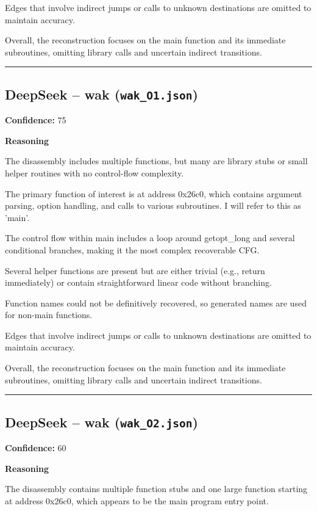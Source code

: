Edges that involve indirect jumps or calls to unknown destinations are omitted to maintain accuracy.

Overall, the reconstruction focuses on the main function and its immediate subroutines, omitting library calls and uncertain indirect transitions.

\bigskip
\hrule
\bigskip

\subsection{DeepSeek -- wak (\texttt{wak\_O1.json})}

\textbf{Confidence:} 75

\textbf{Reasoning}

The disassembly includes multiple functions, but many are library stubs or small helper routines with no control-flow complexity.

The primary function of interest is at address 0x26c0, which contains argument parsing, option handling, and calls to various subroutines. I will refer to this as 'main'.

The control flow within main includes a loop around getopt\_long and several conditional branches, making it the most complex recoverable CFG.

Several helper functions are present but are either trivial (e.g., return immediately) or contain straightforward linear code without branching.

Function names could not be definitively recovered, so generated names are used for non-main functions.

Edges that involve indirect jumps or calls to unknown destinations are omitted to maintain accuracy.

Overall, the reconstruction focuses on the main function and its immediate subroutines, omitting library calls and uncertain indirect transitions.

\bigskip
\hrule
\bigskip

\subsection{DeepSeek -- wak (\texttt{wak\_O2.json})}

\textbf{Confidence:} 60

\textbf{Reasoning}

The disassembly contains multiple function stubs and one large function starting at address 0x26c0, which appears to be the main program entry point.

